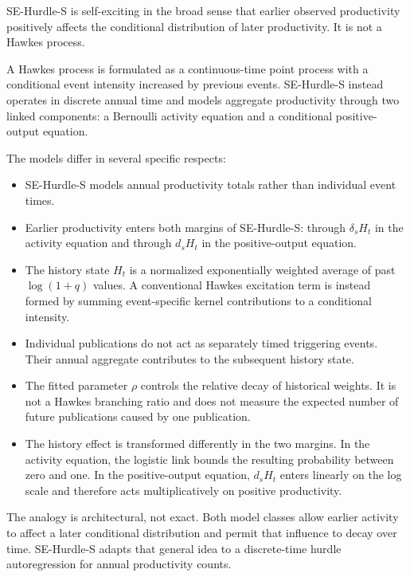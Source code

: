 \documentclass[twocolumn, letterpaper]{article}
\begin{document}
SE-Hurdle-S is self-exciting in the broad sense that earlier observed
productivity positively affects the conditional distribution of later
productivity. It is not a Hawkes process.

A Hawkes process is formulated as a continuous-time point
process with a conditional event intensity increased by previous
events. SE-Hurdle-S instead operates in discrete annual time and models aggregate productivity through two linked components: a Bernoulli activity equation and a conditional positive-output equation.

The models differ in several specific respects:

\begin{itemize}
    \item SE-Hurdle-S models annual productivity totals rather than
    individual event times.
    \item Earlier productivity enters both margins of SE-Hurdle-S:
    through $\delta_s H_t$ in the activity equation and through
    $d_s H_t$ in the positive-output equation.
    \item The history state $H_t$ is a normalized exponentially
    weighted average of past $\log(1+q)$ values. A conventional Hawkes excitation term is instead formed by summing event-specific kernel contributions to a conditional intensity.
    \item Individual publications do not act as separately timed
    triggering events. Their annual aggregate contributes to the
    subsequent history state.
    \item The fitted parameter $\rho$ controls the relative decay of
    historical weights. It is not a Hawkes branching ratio and does not measure the expected number of future publications caused by one publication.
    \item The history effect is transformed differently in the two
    margins. In the activity equation, the logistic link bounds the
    resulting probability between zero and one. In the positive-output equation, $d_sH_t$ enters linearly on the log scale and therefore acts multiplicatively on positive productivity.
\end{itemize}

The analogy is architectural, not exact. Both model
classes allow earlier activity to affect a later conditional
distribution and permit that influence to decay over time. SE-Hurdle-S adapts that general idea to a discrete-time hurdle
autoregression for annual productivity counts.
\end{document}
